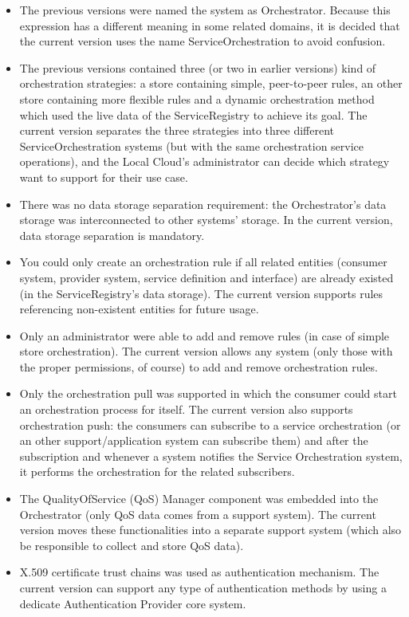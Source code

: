 \documentclass[a4paper]{arrowhead}
\begin{document}
\begin{itemize}
    \item The previous versions were named the system as Orchestrator. Because this expression has a different meaning in some related domains, it is decided that the current version uses the name ServiceOrchestration to avoid confusion.
    \item The previous versions contained three (or two in earlier versions) kind of orchestration strategies: a store containing simple, peer-to-peer rules, an other store containing more flexible rules and a dynamic orchestration method which used the live data of the ServiceRegistry to achieve its goal. The current version separates the three strategies into three different ServiceOrchestration systems (but with the same orchestration service operations), and the Local Cloud's administrator can decide which strategy want to support for their use case.
    \item There was no data storage separation requirement: the Orchestrator's data storage was interconnected to other systems' storage. In the current version, data storage separation is mandatory. 
    \item You could only create an orchestration rule if all related entities (consumer system, provider system, service definition and interface) are already existed (in the ServiceRegistry's data storage). The current version supports rules referencing non-existent entities for future usage. 
    \item Only an administrator were able to add and remove rules (in case of simple store orchestration). The current version allows any system (only those with the proper permissions, of course) to add and remove orchestration rules.
    \item Only the orchestration pull was supported in which the consumer could start an orchestration process for itself. The current version also supports orchestration push: the consumers can subscribe to a service orchestration (or an other support/application system can subscribe them) and after the subscription and whenever a system notifies the Service Orchestration system, it performs the orchestration for the related subscribers.
    \item The QualityOfService (QoS) Manager component was embedded into the Orchestrator (only QoS data comes from a support system). The current version moves these functionalities into a separate support system (which also be responsible to collect and store QoS data).
    \item X.509 certificate trust chains was used as authentication mechanism. The current version can support any type of authentication methods by using a dedicate Authentication Provider core system. 
\end{itemize}
\end{document}
